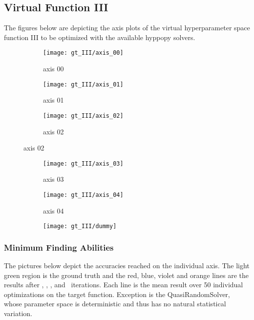 \subsection{Virtual Function III}
The figures below are depicting the axis plots of the virtual hyperparameter space function III to be optimized with the available hyppopy solvers. 
\begin{figure}[h]
	\begin{subfigure}{0.32\textwidth}
		\texttt{[image: gt\_III/axis\_00]} 
		\caption{axis 00}
		\label{fig:axis00_III}
	\end{subfigure}
	\begin{subfigure}{0.32\textwidth}
		\texttt{[image: gt\_III/axis\_01]}
		\caption{axis 01}
		\label{fig:axis01_III}
	\end{subfigure}
	\begin{subfigure}{0.32\textwidth}
		\texttt{[image: gt\_III/axis\_02]}
		\caption{axis 02}
		\label{fig:axis02_III}
	\end{subfigure}
\end{figure}

\begin{figure}[h]
	\begin{subfigure}{0.32\textwidth}
		\texttt{[image: gt\_III/axis\_03]} 
		\caption{axis 03}
		\label{fig:axis03_III}
	\end{subfigure}
	\begin{subfigure}{0.32\textwidth}
		\texttt{[image: gt\_III/axis\_04]}
		\caption{axis 04}
		\label{fig:axis04_III}
	\end{subfigure}
	\begin{subfigure}{0.32\textwidth}
		\texttt{[image: gt\_III/dummy]}
		\caption{}
		\label{fig:dummy1_III}
	\end{subfigure}
\end{figure}


\newpage


\subsubsection{Minimum Finding Abilities}

The pictures below depict the accuracies reached on the individual axis. The light green region is the ground truth and the red, blue, violet and orange lines are the results after \myiterI, \myiterII, \myiterIII, and \myiterIV~iterations. Each line is the mean result over 50 individual optimizations on the target function. Exception is the QuasiRandomSolver, whose parameter space is deterministic and thus has no natural statistical variation. 

